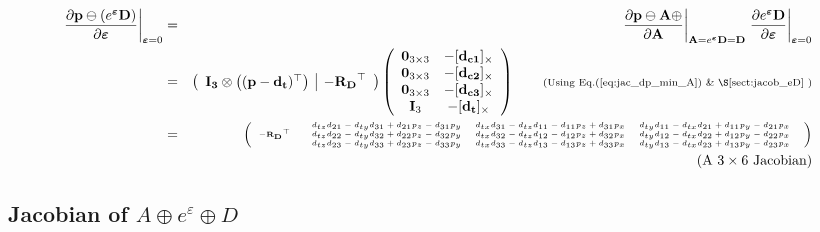 \documentclass[a4paper,11pt]{report}
\newcommand{\E}{{\bm{\varepsilon}}}
\begin{document}
\begin{eqnarray}
\left. \frac{\partial \mathbf{p} \ominus (e^\E \mathbf{D}) }{\partial \E} \right|_{\E = 0}
&=& 
\left. \frac{\partial \mathbf{p} \ominus \mathbf{A} \oplus }{\partial \mathbf{A} } \right|_{\mathbf{A}=e^\E \mathbf{D} = \mathbf{D}}
\left. \frac{\partial e^\E \mathbf{D}}{\partial \E} \right|_{\E=0}
\nonumber \\
&=&
\left(
\begin{array}{c|c}
 \mathbf{I_3} \otimes \left( (\mathbf{p}-\mathbf{d_t})^\top \right)
 &
 -\mathbf{R_D}^\top
\end{array}
\right)
\left(
\begin{array}{cc}
 \mathbf{0}_{3\times 3}  & -[\mathbf{d_{c1}}]_\times \\
 \mathbf{0}_{3\times 3}  & -[\mathbf{d_{c2}}]_\times \\
 \mathbf{0}_{3\times 3}  & -[\mathbf{d_{c3}}]_\times \\
 \mathbf{I}_{3}  & -[\mathbf{d_{t}}]_\times \\
\end{array}
\right) 
\quad\quad \text{\scriptsize{(Using Eq.(\ref{eq:jac_dp_min_A})  \& \S\ref{sect:jacob_eD}} )}
\\
&=& 
\tiny{\left(
\begin{array}{cc}
   -\mathbf{R_D}^\top &
  \begin{array}{ccc}
  d_{tz} d_{21} - d_{ty} d_{31} + d_{21} p_z - d_{31} p_y & d_{tx} d_{31} - d_{tz} d_{11} - d_{11} p_z + d_{31} p_x & d_{ty} d_{11} - d_{tx} d_{21} + d_{11} p_y - d_{21} p_x \\
  d_{tz} d_{22} - d_{ty} d_{32} + d_{22} p_z - d_{32} p_y & d_{tx} d_{32} - d_{tz} d_{12} - d_{12} p_z + d_{32} p_x & d_{ty} d_{12} - d_{tx} d_{22} + d_{12} p_y - d_{22} p_x \\
  d_{tz} d_{23} - d_{ty} d_{33} + d_{23} p_z - d_{33} p_y & d_{tx} d_{33} - d_{tz} d_{13} - d_{13} p_z + d_{33} p_x & d_{ty} d_{13} - d_{tx} d_{23} + d_{13} p_y - d_{23} p_x \\
  \end{array}
\end{array}
\right)} \nonumber \\
 && \quad\quad \quad\quad\quad \text{(A $3 \times 6$ Jacobian)} \nonumber
\end{eqnarray}



\subsection{Jacobian of $A \oplus e^\varepsilon \oplus D$}
\end{document}
